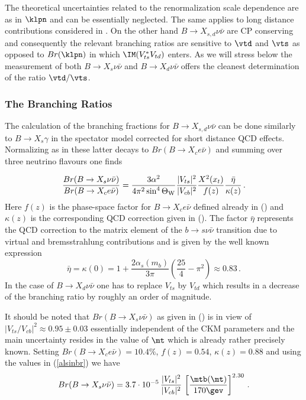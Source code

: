 The theoretical uncertainties related to the renormalization
scale dependence are as in $\klpn$ and 
can be essentially neglected. The same applies to long distance
contributions considered in \cite{BUC97}.
On the other hand $B\to X_{s,d}\nu\bar\nu$ are CP conserving and
consequently the relevant branching ratios are sensitive to 
$\vtd$ and $\vts$ as opposed to $Br(\klpn)$ in which
$\IM (V^\ast_{ts} V_{td})$ enters. As we will stress below the
measurement of both
$B\to X_{s}\nu\bar\nu$ and $B\to X_{d}\nu\bar\nu$ offers the
cleanest determination of the ratio $\vtd/\vts$.

\subsubsection{The Branching Ratios}
The calculation of the branching fractions for $B\to X_{s,d}\nu\bar\nu$ 
can be done similarly to $B\to X_s \gamma$ 
in the spectator model corrected for short distance QCD effects.
Normalizing as in these latter decays 
to $Br(B\to X_c e\bar\nu)$ and summing over three neutrino 
flavours one finds

\begin{equation}\label{bbxnn}
\frac{Br(B\to X_s\nu\bar\nu)}{Br(B\to X_c e\bar\nu)}=
\frac{3 \alpha^2}{4\pi^2\sin^4\Theta_{\rm W}}
\frac{|V_{ts}|^2}{|V_{cb}|^2}\frac{X^2(x_t)}{f(z)}
\frac{\bar\eta}{\kappa(z)}\,.
\end{equation}
Here $f(z)$ is the phase-space factor for $B\to X_c
e\bar\nu$ defined already in () and $\kappa(z)$ is the
corresponding QCD correction given in (). The
factor $\bar\eta$ represents the QCD correction to the matrix element
of the $b\to s\nu\bar\nu$ transition due to virtual and bremsstrahlung
contributions and is given by the well known expression
\begin{equation}\label{etabar}
\bar\eta=\kappa(0)=
1+\frac{2\alpha_s(m_b)}{3\pi}\left(\frac{25}{4}-\pi^2\right)
\approx 0.83\,.
\end{equation}
In the case of $B\to X_d\nu\bar\nu$ one has to replace $V_{ts}$ by
$V_{td}$ which results in a decrease of the branching ratio by
roughly an order of magnitude.

It should be noted that $Br(B \to X_s \nu\bar\nu)$ as given in
() is in view of $|V_{ts}/V_{cb}|^2 \approx 0.95 \pm 0.03$
essentially independent of the CKM parameters and the main uncertainty
resides in the value of $\mt$ which is already rather precisely
known. Setting $Br(B\to X_ce\bar\nu)=10.4\%$, $f(z)=0.54$,
$\kappa(z)=0.88$ and using the values in (\ref{alsinbr})
 we have
\begin{equation}
Br(B \to X_s \nu\bar\nu) = 3.7 \cdot 10^{-5} \,
\frac{|V_{ts}|^2}{|V_{cb}|^2} \,
\left[ \frac{\mtb(\mt)}{170\gev} \right]^{2.30} \, .
\label{eq:bxsnnnum}
\end{equation}

